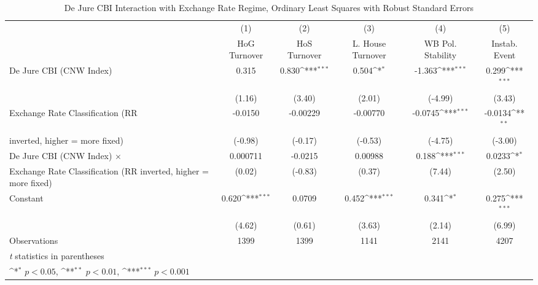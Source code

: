 \begin{table}[htbp]\centering
\def\sym#1{\ifmmode^{#1}\else\(^{#1}\)\fi}
\caption{De Jure CBI Interaction with Exchange Rate Regime, Ordinary Least Squares with Robust Standard Errors \label{imultIndOLSDJ}}
\begin{tabular}{l*{5}{c}}
\toprule
                                        &\multicolumn{1}{c}{(1)}&\multicolumn{1}{c}{(2)}&\multicolumn{1}{c}{(3)}&\multicolumn{1}{c}{(4)}&\multicolumn{1}{c}{(5)}\\
                                        &\multicolumn{1}{c}{HoG Turnover}&\multicolumn{1}{c}{HoS Turnover}&\multicolumn{1}{c}{L. House Turnover}&\multicolumn{1}{c}{WB Pol. Stability}&\multicolumn{1}{c}{Instab. Event}\\
\midrule
De Jure CBI (CNW Index)                 &    0.315         &    0.830\sym{***}&    0.504\sym{*}  &   -1.363\sym{***}&    0.299\sym{***}\\
                                        &   (1.16)         &   (3.40)         &   (2.01)         &  (-4.99)         &   (3.43)         \\
\addlinespace
Exchange Rate Classification (RR        &  -0.0150         & -0.00229         & -0.00770         &  -0.0745\sym{***}&  -0.0134\sym{**} \\
inverted, higher = more fixed)          &  (-0.98)         &  (-0.17)         &  (-0.53)         &  (-4.75)         &  (-3.00)         \\
\addlinespace
De Jure CBI (CNW Index) $\times$        & 0.000711         &  -0.0215         &  0.00988         &    0.188\sym{***}&   0.0233\sym{*}  \\
Exchange Rate Classification (RR inverted, higher = more fixed)&   (0.02)         &  (-0.83)         &   (0.37)         &   (7.44)         &   (2.50)         \\
\addlinespace
Constant                                &    0.620\sym{***}&   0.0709         &    0.452\sym{***}&    0.341\sym{*}  &    0.275\sym{***}\\
                                        &   (4.62)         &   (0.61)         &   (3.63)         &   (2.14)         &   (6.99)         \\
\midrule
Observations                            &     1399         &     1399         &     1141         &     2141         &     4207         \\
\bottomrule
\multicolumn{6}{l}{\footnotesize \textit{t} statistics in parentheses}\\
\multicolumn{6}{l}{\footnotesize \sym{*} \(p<0.05\), \sym{**} \(p<0.01\), \sym{***} \(p<0.001\)}\\
\end{tabular}
\end{table}
